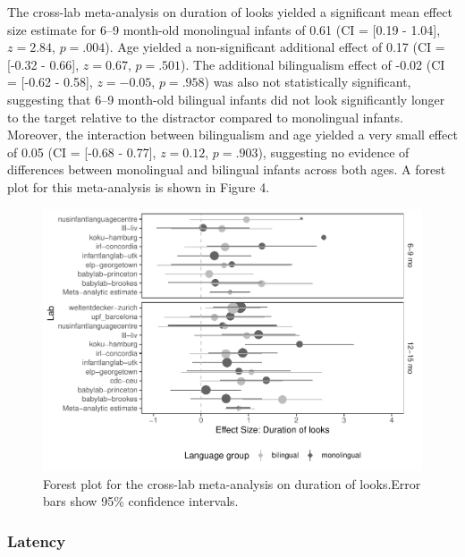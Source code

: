\documentclass[
  english,
  ,man,floatsintext]{apa6}
\begin{document}
The cross-lab meta-analysis on duration of looks yielded a significant mean effect size estimate for 6--9 month-old monolingual infants of 0.61 (CI = {[}0.19 - 1.04{]}, \(z = 2.84\), \(p = .004\)). Age yielded a non-significant additional effect of 0.17 (CI = {[}-0.32 - 0.66{]}, \(z = 0.67\), \(p = .501\)). The additional bilingualism effect of -0.02 (CI = {[}-0.62 - 0.58{]}, \(z = -0.05\), \(p = .958\)) was also not statistically significant, suggesting that 6--9 month-old bilingual infants did not look significantly longer to the target relative to the distractor compared to monolingual infants. Moreover, the interaction between bilingualism and age yielded a very small effect of 0.05 (CI = {[}-0.68 - 0.77{]}, \(z = 0.12\), \(p = .903\)), suggesting no evidence of differences between monolingual and bilingual infants across both ages. A forest plot for this meta-analysis is shown in Figure 4.

\begin{figure}
\centering
\includegraphics{gaze-following-paper_files/figure-latex/fig4-1.pdf}
\caption{\label{fig:fig4}Forest plot for the cross-lab meta-analysis on duration of looks.Error bars show 95\% confidence intervals.}
\end{figure}

\hypertarget{latency-1}{%
\subsubsection{Latency}\label{latency-1}}
\end{document}
